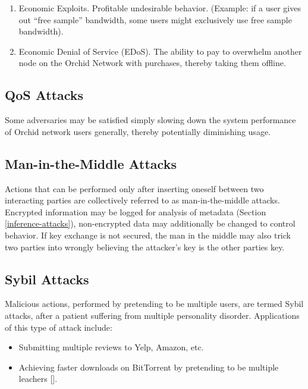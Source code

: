 \documentclass{article}
\newcommand{\mesh}{Orchid}
\begin{document}
\begin{enumerate}
\item Economic Exploits. Profitable undesirable behavior. (Example: if a user gives out “free sample” bandwidth, some users might exclusively use free sample bandwidth).
\item Economic Denial of Service (EDoS). The ability to pay to overwhelm another node on the \mesh{} Network with purchases, thereby taking them offline.
\end{enumerate}

\subsection{QoS Attacks}
\label{qos}

Some adversaries may be satisfied simply slowing down the system performance of \mesh{} network users generally, thereby potentially diminishing usage.

\subsection{Man-in-the-Middle Attacks}
\label{mitm}

Actions that can be performed only after inserting oneself between two interacting parties are collectively referred to as man-in-the-middle attacks. Encrypted information may be logged for analysis of metadata (Section \ref{inference-attacks}), non-encrypted data may additionally be changed to control behavior. If key exchange is not secured, the man in the middle may also trick two parties into wrongly believing the attacker's key is the other parties key.

\subsection{Sybil Attacks}

Malicious actions, performed by pretending to be multiple users, are termed Sybil attacks, after a patient suffering from multiple personality disorder. Applications of this type of attack include:

\begin{itemize}
\item Submitting multiple reviews to Yelp, Amazon, etc.
\item Achieving faster downloads on BitTorrent by pretending to be multiple leachers [\cite{freeridingBittorrent}].
\end{itemize}
\end{document}
